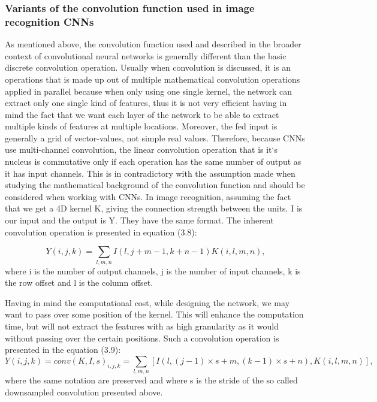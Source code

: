 \documentclass[12pt,a4paper,twoside]{report}
\begin{document}
\subsubsection{Variants of the convolution function used in image recognition CNNs}

As mentioned above, the convolution function used and described in the broader context of convolutional neural networks is generally different than the basic discrete convolution operation. Usually when convolution is discussed, it is an operations that is made up out of multiple mathematical convolution operations applied in parallel because when only using one single kernel, the network can extract only one single kind of features, thus it is not very efficient having in mind the fact that we want each layer of the network to be able to extract multiple kinds of features at multiple locations. Moreover, the fed input is generally a grid of vector-values, not simple real values. Therefore, because CNNs use multi-channel convolution, the linear convolution operation that is it`s nucleus is commutative only if each operation has the same number of output as it has input channels. This is in contradictory with the assumption made when studying the mathematical background of the convolution function and should be considered when working with CNNs.
In image recognition, assuming the fact that we get a 4D kernel K, giving the connection strength between the units. I is our input and the output is Y. They have the same format. The inherent convolution operation is presented in equation (3.8):


\begin{equation}
Y(i,j,k) = \sum_{l,m,n} I(l,j+m-1,k+n-1)K(i,l,m,n),
\end{equation}
where i is the number of output channels, j is the number of input channels, k is the row offset and l is the column offset.

Having in mind the computational cost, while designing the network, we may want to pass over some position of the kernel. This will enhance the computation time, but will not extract the features with as high granularity as it would without passing over the certain positions. Such a convolution operation is presented in the equation (3.9):
\begin{equation}
Y(i,j,k) = conv(K,I,s)_{i,j,k} = \sum_{l,m,n} [I(l,(j-1)\times s+m,(k-1) \times s+n),K(i,l,m,n)],
\end{equation}
where the same notation are preserved and where s is the stride of the so called downsampled convolution presented above.
\end{document}
